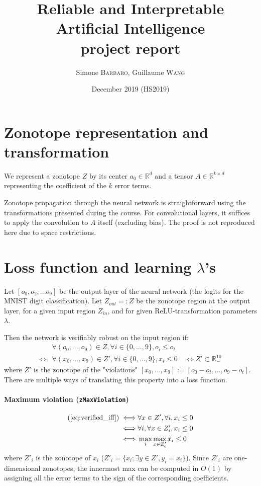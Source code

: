 \documentclass{article}
\title{Reliable and Interpretable Artificial Intelligence \\ project report}
\author{Simone \textsc{Barbaro}, Guillaume \textsc{Wang}}
\date{\small{ December 2019 (HS2019)}}
\newcommand{\RR}{\mathbb{R}}
\begin{document}
\maketitle

\section{Zonotope representation and transformation}

We represent a zonotope $Z$ by its center $a_0 \in \RR^d$ and a tensor $A \in \RR^{k \times d}$ representing the coefficient of the $k$ error terms.

Zonotope propagation through the neural network is straightforward using the transformations presented during the course.
For convolutional layers, it suffices to apply the convolution to $A$ itself (excluding bias).
The proof is not reproduced here due to space restrictions.

\section{Loss function and learning \texorpdfstring{$\lambda$'s}{lambdas}}

Let $[o_0, o_2, ... o_9]$ be the output layer of the neural network (the logits for the MNIST digit classification). 
Let $Z_{out} =: Z$ be the zonotope region at the output layer, for a given input region $Z_{in}$, and for given ReLU-transformation parameters $\lambda$.

Then the network is verifiably robust on the input region if:
\begin{align}
    &\forall (o_0, ..., o_9) \in Z, \forall i \in \{0, ..., 9\}, o_i \leq o_t \nonumber \\
    \iff & \forall (x_0, ..., x_9) \in Z', \forall i \in \{0, ..., 9\}, x_i \leq 0 \nonumber \quad
    \iff Z' \subset \RR_{-}^{10} \label{eq:verified_iff} \tag{*}
\end{align}
where $Z'$ is the zonotope of the "violations" $[x_0, ..., x_9] := [o_0 - o_t, ..., o_9 - o_t]$.
There are multiple ways of translating this property into a loss function.

\paragraph{Maximum violation (\texttt{zMaxViolation})}
\begin{align*}
    ( \ref{eq:verified_iff} )
    \iff & \forall x \in Z', \forall i, x_i \leq 0 \\
    \iff & \forall i, \forall x \in Z'_i, x_i \leq 0 \\
    \iff & \max_i \max_{x \in Z'_i} x_i \leq 0
\end{align*}
where $Z'_i$ is the zonotope of $x_i$ ($Z'_i = \{ x_i; \exists y \in Z', y_i = x_i \}$).
Since $Z'_i$ are one-dimensional zonotopes, the innermost max can be computed in $O(1)$ by assigning all the error terms to the sign of the corresponding coefficients.
\end{document}
